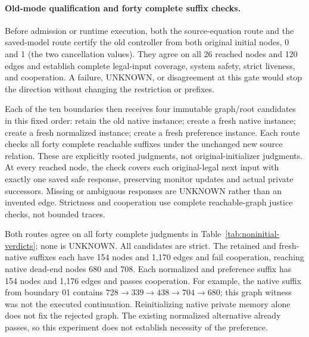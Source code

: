 \paragraph{Old-mode qualification and forty complete suffix checks.}
Before admission or runtime execution, both the source-equation route
and the saved-model route certify the old controller from both original
initial nodes, 0 and 1 (the two cancellation values). They agree on all
26 reached nodes and 120 edges and establish complete legal-input
coverage, system safety, strict liveness, and cooperation. A failure,
UNKNOWN, or disagreement at this gate would stop the direction without
changing the restriction or prefixes.

Each of the ten boundaries then receives four immutable graph/root
candidates in this fixed order: retain the old native instance; create
a fresh native instance; create a fresh normalized instance; create a
fresh preference instance. Each route checks all forty complete reachable
suffixes under the unchanged new source relation. These are explicitly
rooted judgments, not original-initializer judgments. At every reached
node, the check covers each original-legal next input with exactly one
saved safe response, preserving monitor updates and actual private
successors. Missing or ambiguous responses are UNKNOWN rather than an
invented edge. Strictness and cooperation use complete reachable-graph
justice checks, not bounded traces.

Both routes agree on all forty complete judgments in
Table~\ref{tab:noninitial-verdicts}; none is UNKNOWN. All candidates are
strict. The retained and fresh-native suffixes each have 154 nodes and
1,170 edges and fail cooperation, reaching native dead-end nodes 680 and
708. Each normalized and preference suffix has 154 nodes and 1,176 edges
and passes cooperation. For example, the native suffix from boundary 01
contains $728\to339\to438\to704\to680$; this graph witness was not the
executed continuation. Reinitializing native private memory alone does
not fix the rejected graph. The existing normalized alternative already
passes, so this experiment does not establish necessity of the preference.

